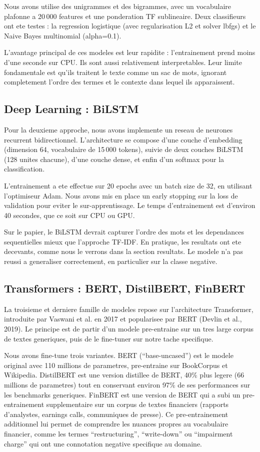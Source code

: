 \documentclass[12pt, a4paper]{article}
\begin{document}
Nous avons utilise des unigrammes et des bigrammes, avec un vocabulaire plafonne
a 20\,000 features et une ponderation TF sublineaire. Deux classifieurs ont ete
testes : la regression logistique (avec regularisation L2 et solver lbfgs) et le
Naive Bayes multinomial (alpha=0.1).

L'avantage principal de ces modeles est leur rapidite : l'entrainement prend moins
d'une seconde sur CPU. Ils sont aussi relativement interpretables. Leur limite
fondamentale est qu'ils traitent le texte comme un sac de mots, ignorant
completement l'ordre des termes et le contexte dans lequel ils apparaissent.

\subsection{Deep Learning : BiLSTM}

Pour la deuxieme approche, nous avons implemente un reseau de neurones recurrent
bidirectionnel. L'architecture se compose d'une couche d'embedding (dimension 64,
vocabulaire de 15\,000 tokens), suivie de deux couches BiLSTM (128 unites chacune),
d'une couche dense, et enfin d'un softmax pour la classification.

L'entrainement a ete effectue sur 20 epochs avec un batch size de 32, en utilisant
l'optimiseur Adam. Nous avons mis en place un early stopping sur la loss de
validation pour eviter le sur-apprentissage. Le temps d'entrainement est d'environ
40 secondes, que ce soit sur CPU ou GPU.

Sur le papier, le BiLSTM devrait capturer l'ordre des mots et les dependances
sequentielles mieux que l'approche TF-IDF. En pratique, les resultats ont ete
decevants, comme nous le verrons dans la section resultats. Le modele n'a pas
reussi a generaliser correctement, en particulier sur la classe negative.

\subsection{Transformers : BERT, DistilBERT, FinBERT}

La troisieme et derniere famille de modeles repose sur l'architecture Transformer,
introduite par Vaswani et al. en 2017 et popularisee par BERT (Devlin et al., 2019).
Le principe est de partir d'un modele pre-entraine sur un tres large corpus de
textes generiques, puis de le fine-tuner sur notre tache specifique.

Nous avons fine-tune trois variantes. BERT (``base-uncased'') est le modele original
avec 110 millions de parametres, pre-entraine sur BookCorpus et Wikipedia. DistilBERT
est une version distillee de BERT, 40\% plus legere (66 millions de parametres) tout
en conservant environ 97\% de ses performances sur les benchmarks generiques. FinBERT
est une version de BERT qui a subi un pre-entrainement supplementaire sur un corpus
de textes financiers (rapports d'analystes, earnings calls, communiques de presse).
Ce pre-entrainement additionnel lui permet de comprendre les nuances propres au
vocabulaire financier, comme les termes ``restructuring'', ``write-down'' ou
``impairment charge'' qui ont une connotation negative specifique au domaine.
\end{document}
